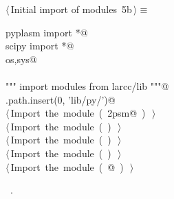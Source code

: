 \documentclass[11pt,oneside]{article}	%
\begin{document}
\begin{flushleft} \small \label{scrap15}
\protect{}$\langle\,$Initial import of modules\nobreak\ {\footnotesize 5b}$\,\rangle\equiv$
\vspace{-1ex}
\begin{list}{}{} \item
\mbox{}\verb@from pyplasm import *@\\
\mbox{}\verb@from scipy import *@\\
\mbox{}\verb@import os,sys@\\
\mbox{}\verb@@\\
\mbox{}\verb@""" import modules from larcc/lib """@\\
\mbox{}\verb@sys.path.insert(0, 'lib/py/')@\\
\mbox{}\verb@@\hbox{$\langle\,$Import the module\nobreak\ ({\footnotesize {}\label{scrap16}
 }\mbox{}\verb@lar2psm@ ) {\footnotesize {}}$\,\rangle$}\verb@@\\
\mbox{}\verb@@\hbox{$\langle\,$Import the module\nobreak\ ({\footnotesize {}\label{scrap17}
 }\mbox{}\verb@simplexn@ ) {\footnotesize {}}$\,\rangle$}\verb@@\\
\mbox{}\verb@@\hbox{$\langle\,$Import the module\nobreak\ ({\footnotesize {}\label{scrap18}
 }\mbox{}\verb@larcc@ ) {\footnotesize {}}$\,\rangle$}\verb@@\\
\mbox{}\verb@@\hbox{$\langle\,$Import the module\nobreak\ ({\footnotesize {}\label{scrap19}
 }\mbox{}\verb@largrid@ ) {\footnotesize {}}$\,\rangle$}\verb@@\\
\mbox{}\verb@@\hbox{$\langle\,$Import the module\nobreak\ ({\footnotesize {}\label{scrap20}
 }\mbox{}@ ) {\footnotesize {}}$\,\rangle$}\verb@@\\
\mbox{}\verb@@{\NWsep}
\end{list}
\vspace{-1ex}
\footnotesize\addtolength{\baselineskip}{-1ex}
\begin{list}{}{\setlength{\itemsep}{-\parsep}\setlength{\itemindent}{-\leftmargin}}
\item \NWtxtMacroRefIn\ .
\end{list}
\end{flushleft}
\end{document}
